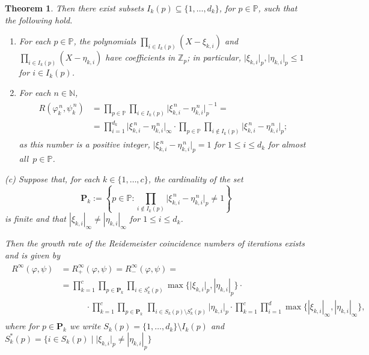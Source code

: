 \documentclass[12pt, a4paper]{amsart}
\newtheorem{theorem}{Theorem}
\begin{document}
\begin{theorem}
  Then there exist subsets $I_k(p) \subseteq \{1,\ldots,d_k\}$, for
  $p \in \mathbb{P}$, such that the following hold.
  \begin{enumerate}
  \item[(i)] For each $p \in \mathbb{P}$, the polynomials
    $\prod_{i \in I_k(p)} (X - \xi_{k,i})$ and
    $\prod_{i \in I_k(p)} (X - \eta_{k,i})$ have coefficients in
    $\mathbb{Z}_p$; in particular,
    $\lvert \xi_{k,i} \rvert_p , \lvert \eta_{k,i} \rvert_p \le 1$ for
    $i \in I_k(p)$.
  \item[(ii)] For each $n \in \mathbb{N}$,
  \begin{align} \label{equ:key-formula-2}
  \begin{split}
    R(\varphi_k^{\, n},\psi_k^{\, n}) &= \prod_{p \in \mathbb{P}}
    \prod_{i \in I_k(p)} \lvert \xi_{k,i}^{\, n} - \eta_{k,i}^{\, n}
    \rvert_p^{\, -1} =\\
    &= \prod_{i=1}^{d_k }\lvert \xi_{k,i}^{\, n} -
    \eta_{k,i}^{\, n} \rvert_\infty \cdot \prod_{p \in \mathbb{P}}
    \prod_{i \not \in I_k(p)} \lvert \xi_{k,i}^{\, n} - \eta_{k,i}^{\,
      n} \rvert_p;
    \end{split}
  \end{align}
    as this number is a positive integer,
    $\lvert \xi_{k,i}^{\, n} - \eta_{k,i}^{\, n} \rvert_p = 1$ for
    $1 \le i \le d_k$ for almost all~$p \in \mathbb{P}$.
  \end{enumerate}

  \smallskip
  \rm{(c)} Suppose that, for each $k \in \{1, \ldots, c\}$, the cardinality of the set
  $$
    \mathbf{P}_k:=\left\{p\in \mathbb{P}\colon \prod_{i \not\in I_k(p)} \lvert \xi_{k,i}^{\, n}
      - \eta_{k,i}^{\, n} \rvert_p \neq 1\right\}
  $$
  is finite  and that $| \xi_{k,i} |_\infty \neq |\eta_{k,i}|_\infty$ for $1 \le i \le d_k$.

  Then the growth rate of the  Reidemeister coincidence numbers of iterations exists and is given by
  \begin{align}\begin{split}\label{eq:growth-coinc}
    R^{\infty}(\varphi, \psi) &= R^{\infty}_{+}(\varphi, \psi) = R^{\infty}_{-}(\varphi, \psi) = \\
    &= \prod_{k=1}^c \prod_{p \in \mathbf{P}_k} \prod_{i \in S^*_k(p)} \max \{ \lvert \xi_{k,i} \rvert_p,  |\eta_{k,i}|_p\} \cdot \\
    & \hspace{3em}
     \cdot \prod_{k=1}^c \prod_{p \in \mathbf{P}_k} \, \prod_{i \in S_k(p)\setminus S^*_k(p)}\lvert \eta_{k,i} \rvert_p  \cdot
     \prod_{k=1}^c \prod_{i=1}^{d} \max\{|\xi_{k,i}|_\infty, |\eta_{k,i}|_\infty\},
  \end{split}\end{align}
  where for $p \in \mathbf{P}_k$ we write $S_k(p) = \{1,\dots,d_k\}\setminus I_k(p)$
  and $S_k^*(p) = \big\{i \in S_k(p) \mid \lvert \xi_{k,i} \rvert_p \neq |\eta_{k,i}|_p \big\}$
\end{theorem}
\end{document}
